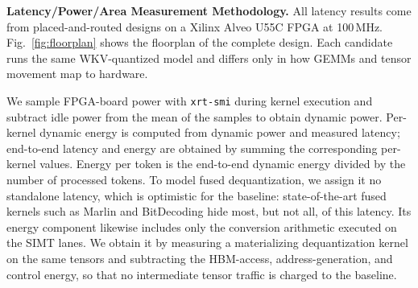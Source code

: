 \documentclass[sigconf,anonymous,nonacm]{acmart}
\newcommand{\wkv}{WKV}
\begin{document}
\textbf{Latency/Power/Area Measurement Methodology.}
All latency results come from placed-and-routed designs on a Xilinx Alveo U55C FPGA at 100\,MHz. Fig.~\ref{fig:floorplan} shows the floorplan of the complete design. Each candidate runs the same \wkv{}-quantized model and differs only in how GEMMs and tensor movement map to hardware.

We sample FPGA-board power with \texttt{xrt-smi} during kernel execution and subtract idle power from the mean of the samples to obtain dynamic power. Per-kernel dynamic energy is computed from dynamic power and measured latency; end-to-end latency and energy are obtained by summing the corresponding per-kernel values. Energy per token is the end-to-end dynamic energy divided by the number of processed tokens.
To model fused dequantization, we assign it no standalone latency, which is optimistic for the baseline: state-of-the-art fused kernels such as Marlin\cite{marlin} and BitDecoding\cite{bitdecoding} hide most, but not all, of this latency. Its energy component likewise includes only the conversion arithmetic executed on the SIMT lanes. We obtain it by measuring a materializing dequantization kernel on the same tensors and subtracting the HBM-access, address-generation, and control energy, so that no intermediate tensor traffic is charged to the baseline.
\end{document}
